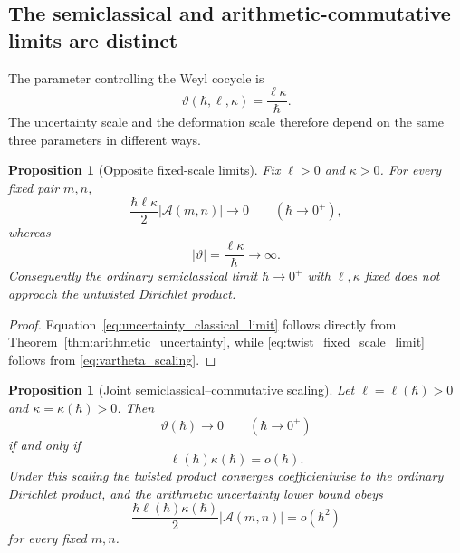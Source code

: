 \documentclass[11pt]{amsart}
\numberwithin{equation}{section}
\theoremstyle{plain}
\newtheorem{proposition}[theorem]{Proposition}
\theoremstyle{definition}
\theoremstyle{remark}
\begin{document}
\subsection{The semiclassical and arithmetic-commutative limits are distinct}
\label{subsec:two_limits}

The parameter controlling the Weyl cocycle is
\begin{equation}
\vartheta(\hbar,\ell,\kappa)
=
\frac{\ell\kappa}{\hbar}.
\label{eq:vartheta_scaling}
\end{equation}
The uncertainty scale and the deformation scale therefore depend on the same
three parameters in different ways.

\begin{proposition}[Opposite fixed-scale limits]
\label{prop:opposite_limits}
Fix \(\ell>0\) and \(\kappa>0\).  For every fixed pair \(m,n\),
\begin{equation}
\frac{\hbar\ell\kappa}{2}|\mathcal A(m,n)|
\longrightarrow0
\qquad(\hbar\to0^+),
\label{eq:uncertainty_classical_limit}
\end{equation}
whereas
\begin{equation}
|\vartheta|
=
\frac{\ell\kappa}{\hbar}
\longrightarrow\infty.
\label{eq:twist_fixed_scale_limit}
\end{equation}
Consequently the ordinary semiclassical limit \(\hbar\to0^+\) with
\(\ell,\kappa\) fixed does not approach the untwisted Dirichlet product.
\end{proposition}

\begin{proof}
Equation~\eqref{eq:uncertainty_classical_limit} follows directly from
Theorem~\ref{thm:arithmetic_uncertainty}, while
\eqref{eq:twist_fixed_scale_limit} follows from
\eqref{eq:vartheta_scaling}.
\end{proof}

\begin{proposition}[Joint semiclassical--commutative scaling]
\label{prop:joint_scaling}
Let \(\ell=\ell(\hbar)>0\) and
\(\kappa=\kappa(\hbar)>0\).  Then
\begin{equation}
\vartheta(\hbar)\longrightarrow0
\qquad(\hbar\to0^+)
\label{eq:theta_to_zero_condition}
\end{equation}
if and only if
\begin{equation}
\ell(\hbar)\kappa(\hbar)=o(\hbar).
\label{eq:joint_scaling_condition}
\end{equation}
Under this scaling the twisted product converges coefficientwise to the
ordinary Dirichlet product, and the arithmetic uncertainty lower bound obeys
\begin{equation}
\frac{\hbar\ell(\hbar)\kappa(\hbar)}{2}
|\mathcal A(m,n)|
=o(\hbar^2)
\label{eq:joint_uncertainty_decay}
\end{equation}
for every fixed \(m,n\).
\end{proposition}
\end{document}
